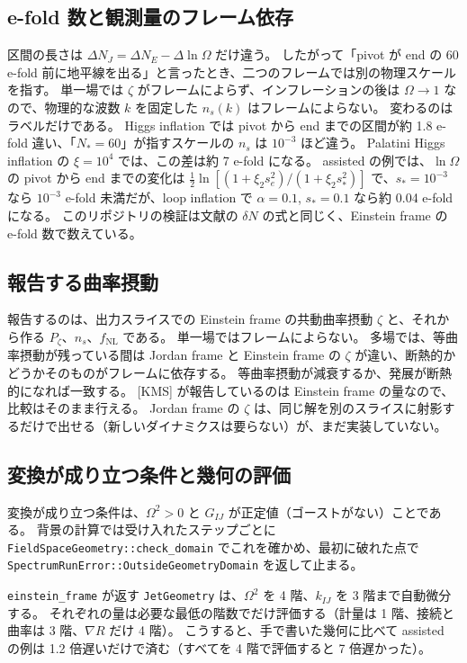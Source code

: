 \documentclass[a4paper,11pt]{ltjsarticle}
\newcommand{\fnl}{f_{\mathrm{NL}}}
\newcommand{\code}[1]{\texttt{#1}}
\begin{document}
\subsection{e-fold 数と観測量のフレーム依存}
区間の長さは $\Delta N_J=\Delta N_E-\Delta\ln\Omega$ だけ違う。
したがって「pivot が end の 60 e-fold 前に地平線を出る」と言ったとき、二つのフレームでは別の物理スケールを指す。
単一場では $\zeta$ がフレームによらず、インフレーションの後は $\Omega\to1$ なので、物理的な波数 $k$ を固定した $n_s(k)$ はフレームによらない。
変わるのはラベルだけである。
Higgs inflation では pivot から end までの区間が約 1.8 e-fold 違い、「$N_*=60$」が指すスケールの $n_s$ は $10^{-3}$ ほど違う。
Palatini Higgs inflation の $\xi=10^4$ では、この差は約 7 e-fold になる。
assisted の例では、$\ln\Omega$ の pivot から end までの変化は $\tfrac12\ln[(1+\xi_2s_e^2)/(1+\xi_2s_*^2)]$ で、$s_*=10^{-3}$ なら $10^{-3}$ e-fold 未満だが、loop inflation で $\alpha=0.1$, $s_*=0.1$ なら約 0.04 e-fold になる。
このリポジトリの検証は文献の $\delta N$ の式と同じく、Einstein frame の e-fold 数で数えている。

\subsection{報告する曲率摂動}
報告するのは、出力スライスでの Einstein frame の共動曲率摂動 $\zeta$ と、それから作る $P_\zeta$、$n_s$、$\fnl$ である。
単一場ではフレームによらない。
多場では、等曲率摂動が残っている間は Jordan frame と Einstein frame の $\zeta$ が違い、断熱的かどうかそのものがフレームに依存する\cite{WMS2012}。
等曲率摂動が減衰するか、発展が断熱的になれば一致する。
[KMS] が報告しているのは Einstein frame の量なので、比較はそのまま行える。
Jordan frame の $\zeta$ は、同じ解を別のスライスに射影するだけで出せる（新しいダイナミクスは要らない）が、まだ実装していない。

\subsection{変換が成り立つ条件と幾何の評価}
変換が成り立つ条件は、$\Omega^2>0$ と $G_{IJ}$ が正定値（ゴーストがない）ことである。
背景の計算では受け入れたステップごとに \code{FieldSpaceGeometry::check\_domain} でこれを確かめ、最初に破れた点で \code{SpectrumRunError::OutsideGeometryDomain} を返して止まる。


\code{einstein\_frame} が返す \code{JetGeometry} は、$\Omega^2$ を 4 階、$k_{IJ}$ を 3 階まで自動微分する。
それぞれの量は必要な最低の階数でだけ評価する（計量は 1 階、接続と曲率は 3 階、$\nabla R$ だけ 4 階）。
こうすると、手で書いた幾何に比べて assisted の例は 1.2 倍遅いだけで済む（すべてを 4 階で評価すると 7 倍遅かった）。
\end{document}
